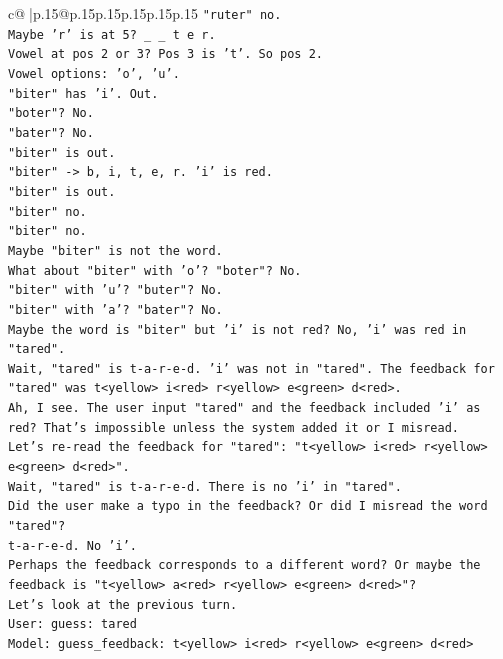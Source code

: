 \documentclass{article}
\begin{document}
{\begin{supertabular}{c@{$\;$}|p{.15\linewidth}@{}p{.15\linewidth}p{.15\linewidth}p{.15\linewidth}p{.15\linewidth}p{.15\linewidth}}
{{{\texttt{"ruter" no.} \\
\texttt{Maybe 'r' is at 5? \_ \_ t e r.} \\
\texttt{Vowel at pos 2 or 3? Pos 3 is 't'. So pos 2.} \\
\texttt{Vowel options: 'o', 'u'.} \\
\texttt{"biter" has 'i'. Out.} \\
\texttt{"boter"? No.} \\
\texttt{"bater"? No.} \\
\texttt{"biter" is out.} \\
\texttt{"biter" {-}> b, i, t, e, r. 'i' is red.} \\
\texttt{"biter" is out.} \\
\texttt{"biter" no.} \\
\texttt{"biter" no.} \\
\texttt{Maybe "biter" is not the word.} \\
\texttt{What about "biter" with 'o'? "boter"? No.} \\
\texttt{"biter" with 'u'? "buter"? No.} \\
\texttt{"biter" with 'a'? "bater"? No.} \\
\texttt{Maybe the word is "biter" but 'i' is not red? No, 'i' was red in "tared".} \\
\texttt{Wait, "tared" is t{-}a{-}r{-}e{-}d. 'i' was not in "tared". The feedback for "tared" was t<yellow> i<red> r<yellow> e<green> d<red>.} \\
\texttt{Ah, I see. The user input "tared" and the feedback included 'i' as red? That's impossible unless the system added it or I misread.} \\
\texttt{Let's re{-}read the feedback for "tared": "t<yellow> i<red> r<yellow> e<green> d<red>".} \\
\texttt{Wait, "tared" is t{-}a{-}r{-}e{-}d. There is no 'i' in "tared".} \\
\texttt{Did the user make a typo in the feedback? Or did I misread the word "tared"?} \\
\texttt{t{-}a{-}r{-}e{-}d. No 'i'.} \\
\texttt{Perhaps the feedback corresponds to a different word? Or maybe the feedback is "t<yellow> a<red> r<yellow> e<green> d<red>"?} \\
\texttt{Let's look at the previous turn.} \\
\texttt{User: guess: tared} \\
\texttt{Model: guess\_feedback: t<yellow> i<red> r<yellow> e<green> d<red>} \\
}}}
\end{supertabular}}
\end{document}
